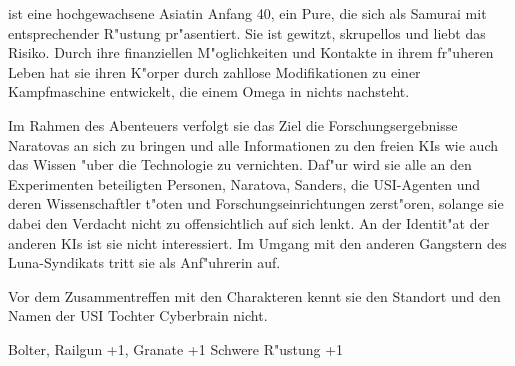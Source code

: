 \xl{} ist eine hochgewachsene Asiatin Anfang 40, ein Pure, die sich als Samurai mit entsprechender R"ustung pr"asentiert. Sie ist gewitzt, skrupellos und liebt das Risiko. Durch ihre finanziellen M"oglichkeiten und Kontakte in ihrem fr"uheren Leben hat sie ihren K"orper durch zahllose Modifikationen zu einer Kampfmaschine entwickelt, die einem Omega in nichts nachsteht.

Im Rahmen des Abenteuers verfolgt sie das Ziel die Forschungsergebnisse Naratovas an sich zu bringen und alle Informationen zu den freien KIs wie auch das Wissen "uber die Technologie zu vernichten. Daf"ur wird sie alle an den Experimenten beteiligten Personen, Naratova, Sanders, die USI-Agenten und deren Wissenschaftler t"oten und Forschungseinrichtungen zerst"oren, solange sie dabei den Verdacht nicht zu offensichtlich auf sich lenkt. An der Identit"at der anderen KIs ist sie nicht interessiert. Im Umgang mit den anderen Gangstern des Luna-Syndikats tritt sie als Anf"uhrerin auf.

Vor dem Zusammentreffen mit den Charakteren kennt sie den Standort und den Namen der USI Tochter Cyberbrain nicht.

\begin{nscsheet}[f]{\xls}
    \nscstats[ATT=3,AGG=3,DEX=2,COM=2,CON=2]
    \nscruler
    \begin{nscinventory}
        \nscitem[Waffen] Bolter, Railgun +1, Granate +1
        \nscitem[R"ustung] Schwere R"ustung +1
    \end{nscinventory}
\end{nscsheet}
